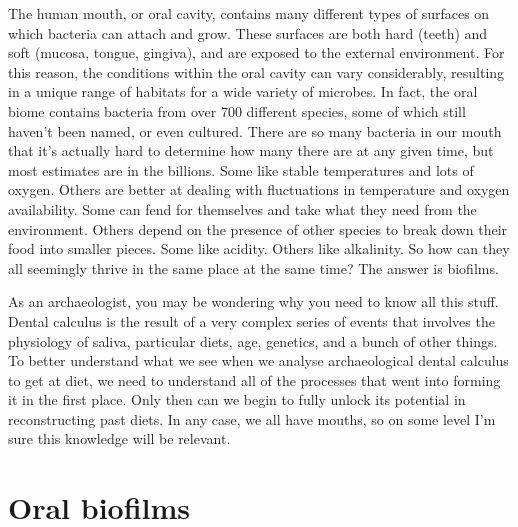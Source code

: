 \documentclass[
  letterpaper,
]{book}
\begin{document}
The human mouth, or oral cavity, contains many different types of
surfaces on which bacteria can attach and grow. These surfaces are both
hard (teeth) and soft (mucosa, tongue, gingiva), and are exposed to the
external environment. For this reason, the conditions within the oral
cavity can vary considerably, resulting in a unique range of habitats
for a wide variety of microbes. In fact, the oral biome contains
bacteria from over 700 different species, some of which still haven't
been named, or even cultured. There are so many bacteria in our mouth
that it's actually hard to determine how many there are at any given
time, but most estimates are in the billions. Some like stable
temperatures and lots of oxygen. Others are better at dealing with
fluctuations in temperature and oxygen availability. Some can fend for
themselves and take what they need from the environment. Others depend
on the presence of other species to break down their food into smaller
pieces. Some like acidity. Others like alkalinity. So how can they all
seemingly thrive in the same place at the same time? The answer is
biofilms.

As an archaeologist, you may be wondering why you need to know all this
stuff. Dental calculus is the result of a very complex series of events
that involves the physiology of saliva, particular diets, age, genetics,
and a bunch of other things. To better understand what we see when we
analyse archaeological dental calculus to get at diet, we need to
understand all of the processes that went into forming it in the first
place. Only then can we begin to fully unlock its potential in
reconstructing past diets. In any case, we all have mouths, so on some
level I'm sure this knowledge will be relevant.

\hypertarget{background-biofilms}{%
\section{Oral biofilms}\label{background-biofilms}}
\end{document}

